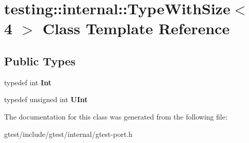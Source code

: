 \hypertarget{classtesting_1_1internal_1_1TypeWithSize_3_014_01_4}{}\section{testing\+:\+:internal\+:\+:Type\+With\+Size$<$ 4 $>$ Class Template Reference}
\label{classtesting_1_1internal_1_1TypeWithSize_3_014_01_4}
\subsection*{Public Types}
\begin{DoxyCompactItemize}
\item 
\mbox{\label{classtesting_1_1internal_1_1TypeWithSize_3_014_01_4_a80351860c00ed665e73f952143f4484a}} 
typedef int {\bfseries Int}
\item 
\mbox{\label{classtesting_1_1internal_1_1TypeWithSize_3_014_01_4_a7d559570f830bf35d095eeb94d98de58}} 
typedef unsigned int {\bfseries U\+Int}
\end{DoxyCompactItemize}


The documentation for this class was generated from the following file\+:\begin{DoxyCompactItemize}
\item 
gtest/include/gtest/internal/gtest-\/port.\+h\end{DoxyCompactItemize}
